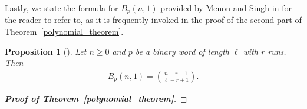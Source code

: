 \documentclass[11pt]{amsart}
\newcommand{\defeq}{\vcentcolon=}
\newtheorem{prop}[theorem]{Proposition}
\DeclareMathOperator{\image}{Im}
\begin{document}
Lastly, we state the formula for $B_p(n,1)$ provided by Menon and Singh in \cite{subseq_freq} for the reader to refer to, as it is frequently invoked in the proof of the second part of Theorem~\ref{polynomial_theorem}.

\begin{prop}[{\cite[Proposition 3.2]{subseq_freq}}]\label{menon_singh_result_k_1}
    Let $n\geq0$ and $p$ be a binary word of length $\ell$ with $r$ runs. Then
    \begin{align*}
        B_p(n,1)={n-r+1\choose\ell-r+1}.
    \end{align*}
\end{prop}



\begin{proof}[\textbf{Proof of Theorem~\ref{polynomial_theorem}}]
    
    
    
    

    
    
    

\end{proof}
\end{document}
